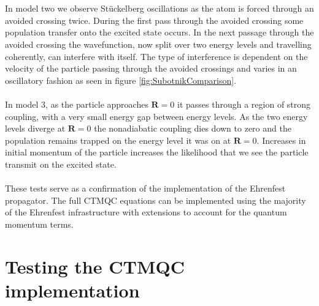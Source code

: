 \\\\
In model two we observe St\"uckelberg oscillations as the atom is forced through an avoided crossing twice. During the first pass through the avoided crossing some population transfer onto the excited state occurs. In the next passage through the avoided crossing the wavefunction, now split over two energy levels and travelling coherently, can interfere with itself. The type of interference is dependent on the velocity of the particle passing through the avoided crossings and varies in an oscillatory fashion as seen in figure \ref{fig:SubotnikComparison}.
\\\\
In model 3, as the particle approaches $\mathbf{R}=0$ it passes through a region of strong coupling, with a very small energy gap between energy levels. As the two energy levels diverge at $\mathbf{R}=0$ the nonadiabatic coupling dies down to zero and the population remains trapped on the energy level it was on at $\mathbf{R}=0$. Increases in initial momentum of the particle increases the likelihood that we see the particle transmit on the excited state.
\\\\
These tests serve as a confirmation of the implementation of the Ehrenfest propagator. The full CTMQC equations can be implemented using the majority of the Ehrenfest infrastructure with extensions to account for the quantum momentum terms.

\section{Testing the CTMQC implementation}
